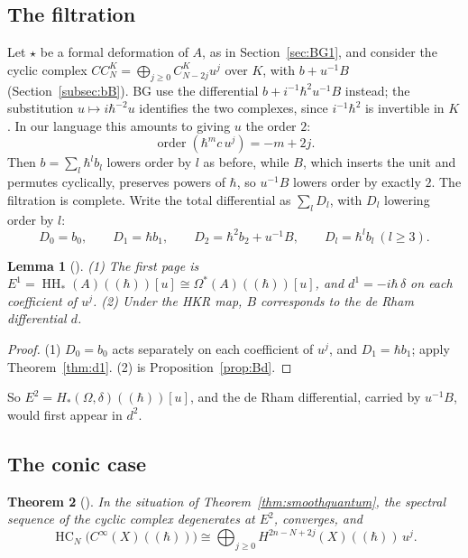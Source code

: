 \documentclass[11pt,oneside,reqno]{article}
\DeclareMathOperator{\HH}{HH}
\DeclareMathOperator{\HC}{HC}
\newcommand{\CI}{C^\infty}
\newcommand{\Om}{\Omega}
\newcommand{\hb}{\hbar}
\newcommand{\Lser}[1]{(\!(#1)\!)}
\theoremstyle{plain}
\newtheorem{theorem}{Theorem}[section]
\newtheorem{lemma}[theorem]{Lemma}
\theoremstyle{definition}
\theoremstyle{remark}
\begin{document}
\subsection{The filtration}\label{subsec:cycfilt}
Let \(\star\) be a formal deformation of \(A\), as in Section~\ref{sec:BG1}, and
consider the cyclic complex \(CC^K_N=\bigoplus_{j\ge0}C^K_{N-2j}u^j\) over \(K\), with
\(b+u^{-1}B\) (Section~\ref{subsec:bB}). BG use the differential
\(b+i^{-1}\hb^2u^{-1}B\) instead; the substitution \(u\mapsto i\hb^{-2}u\) identifies the
two complexes, since \(i^{-1}\hb^2\) is invertible in \(K\). In our language this
amounts to giving \(u\) the order \(2\):
\[
 \operatorname{order}(\hb^mc\,u^j)=-m+2j .
\]
Then \(b=\sum_l\hb^lb_l\) lowers order by \(l\) as before, while \(B\), which inserts the
unit and permutes cyclically, preserves powers of \(\hb\), so \(u^{-1}B\) lowers order by
exactly \(2\). The filtration is complete. Write the total differential as
\(\sum_lD_l\), with \(D_l\) lowering order by \(l\):
\[
 D_0=b_0,\qquad D_1=\hb b_1,\qquad D_2=\hb^2b_2+u^{-1}B,\qquad D_l=\hb^lb_l\ (l\ge3).
\]

\begin{lemma}[{\cite[\S3, Lemma]{BG}}]\label{lem:BG3}
\textup{(1)} The first page is \(E^1=\HH_*(A)\Lser{\hb}[u]\cong\Om^*(A)\Lser{\hb}[u]\), and
\(d^1=-i\hb\,\delta\) on each coefficient of \(u^j\).
\textup{(2)} Under the HKR map, \(B\) corresponds to the de Rham differential \(d\).
\end{lemma}

\begin{proof}
(1) \(D_0=b_0\) acts separately on each coefficient of \(u^j\), and \(D_1=\hb b_1\);
apply Theorem~\ref{thm:d1}. (2) is Proposition~\ref{prop:Bd}.
\end{proof}

So \(E^2=H_*(\Om,\delta)\Lser{\hb}[u]\), and the de Rham differential, carried by
\(u^{-1}B\), would first appear in \(d^2\).

\subsection{The conic case}\label{subsec:BG3conic}

\begin{theorem}[{\cite[\S3, Theorem and Corollary]{BG}}]\label{thm:BG3}
In the situation of Theorem~\ref{thm:smoothquantum}, the spectral sequence of
the cyclic complex degenerates at \(E^2\), converges, and
\[
 \HC_N\bigl(\CI(X)\Lser{\hb}\bigr)\cong\bigoplus_{j\ge0}H^{2n-N+2j}(X)\Lser{\hb}\,u^j .
\]
\end{theorem}
\end{document}

